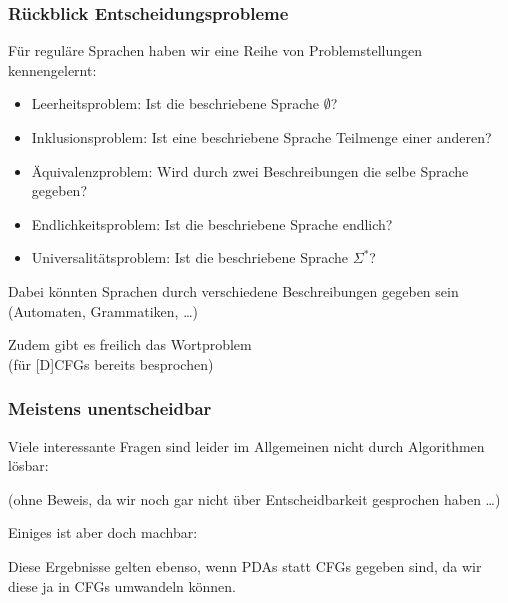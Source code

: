 \documentclass[aspectratio=1610,onlymath]{beamer}
\begin{document}
% 
% 


\begin{frame}\frametitle{Rückblick Entscheidungsprobleme}

Für reguläre Sprachen haben wir eine Reihe von Problemstellungen kennengelernt:
\begin{itemize}
\item \alert{Leerheitsproblem:} Ist die beschriebene Sprache $\emptyset$?
\item \alert{Inklusionsproblem:} Ist eine beschriebene Sprache Teilmenge einer anderen?
\item \alert{Äquivalenzproblem:} Wird durch zwei Beschreibungen die selbe Sprache gegeben?
\item \alert{Endlichkeitsproblem:} Ist die beschriebene Sprache endlich?
\item \alert{Universalitätsproblem:} Ist die beschriebene Sprache $\Sigma^*$?
\end{itemize}

Dabei könnten Sprachen durch verschiedene Beschreibungen gegeben sein (Automaten, Grammatiken, \ldots)
\medskip

\footnotesize
\textcolor{devilscss}{Zudem gibt es freilich das Wortproblem\\ (für [D]CFGs bereits besprochen)}

\end{frame}

\begin{frame}\frametitle{Meistens unentscheidbar}

Viele interessante Fragen sind leider im Allgemeinen nicht durch Algorithmen lösbar:\medskip


(ohne Beweis, da wir noch gar nicht über Entscheidbarkeit gesprochen haben \ldots)
\medskip\pause

Einiges ist aber doch machbar:

\medskip

Diese Ergebnisse gelten ebenso, wenn PDAs statt CFGs gegeben sind, da wir diese ja in CFGs umwandeln können.

\end{frame}
\end{document}
